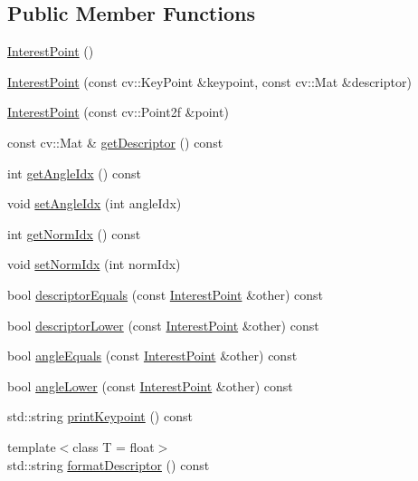 \subsection*{Public Member Functions}
\begin{DoxyCompactItemize}
\item 
\hyperlink{classdefals_1_1_interest_point_a1b6bd2869b17262d6ff88ce9af43d9fd}{Interest\+Point} ()
\item 
\hyperlink{classdefals_1_1_interest_point_a04ef8003424a0d0a122ba8ec1d1bd8b6}{Interest\+Point} (const cv\+::\+Key\+Point \&keypoint, const cv\+::\+Mat \&descriptor)
\item 
\hyperlink{classdefals_1_1_interest_point_a0c56edbec7b284702d2c8f9fc2aa55f4}{Interest\+Point} (const cv\+::\+Point2f \&point)
\item 
const cv\+::\+Mat \& \hyperlink{classdefals_1_1_interest_point_a1defbefa0bceea4052200c4348e4ef52}{get\+Descriptor} () const
\item 
int \hyperlink{classdefals_1_1_interest_point_a63862b65c659caa8f2098bdbf06c2b7c}{get\+Angle\+Idx} () const
\item 
void \hyperlink{classdefals_1_1_interest_point_a8fa7d8032a91b91a85eafefd2f46988e}{set\+Angle\+Idx} (int angle\+Idx)
\item 
int \hyperlink{classdefals_1_1_interest_point_a66e0a2140102e33905d198041602396b}{get\+Norm\+Idx} () const
\item 
void \hyperlink{classdefals_1_1_interest_point_ab8d314ee9fd1482bf8705ad6615e06a0}{set\+Norm\+Idx} (int norm\+Idx)
\item 
bool \hyperlink{classdefals_1_1_interest_point_ad479527a3ec0d7f765f949d6b41c10a6}{descriptor\+Equals} (const \hyperlink{classdefals_1_1_interest_point}{Interest\+Point} \&other) const
\item 
bool \hyperlink{classdefals_1_1_interest_point_aba9dc4741dd4631df0d1e7567eea9bc4}{descriptor\+Lower} (const \hyperlink{classdefals_1_1_interest_point}{Interest\+Point} \&other) const
\item 
bool \hyperlink{classdefals_1_1_interest_point_ab9b4ce92e93ed5e946e94d38a328c15b}{angle\+Equals} (const \hyperlink{classdefals_1_1_interest_point}{Interest\+Point} \&other) const
\item 
bool \hyperlink{classdefals_1_1_interest_point_ac90c377bd678447a7dac9f0c17765976}{angle\+Lower} (const \hyperlink{classdefals_1_1_interest_point}{Interest\+Point} \&other) const
\item 
std\+::string \hyperlink{classdefals_1_1_interest_point_af99319f9c5cd2126719d1ec804572a3f}{print\+Keypoint} () const
\item 
{\footnotesize template$<$class T  = float$>$ }\\std\+::string \hyperlink{classdefals_1_1_interest_point_a47d55468ef29a100ed6c118e5bf21ae8}{format\+Descriptor} () const
\end{DoxyCompactItemize}
